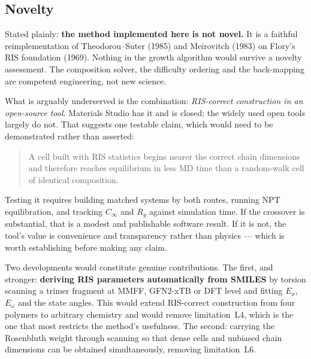\documentclass[11pt,a4paper]{article}
\begin{document}
\subsection{Novelty}

Stated plainly: \textbf{the method implemented here is not novel.} It is a
faithful reimplementation of Theodorou--Suter (1985) and Meirovitch (1983) on
Flory's RIS foundation (1969). Nothing in the growth algorithm would survive a
novelty assessment. The composition solver, the difficulty ordering and the
back-mapping are competent engineering, not new science.

What is arguably underserved is the combination: \emph{RIS-correct
construction in an open-source tool}. Materials Studio has it and is closed;
the widely used open tools largely do not. That suggests one testable claim,
which would need to be demonstrated rather than asserted:

\begin{quote}
A cell built with RIS statistics begins nearer the correct chain dimensions
and therefore reaches equilibrium in less MD time than a random-walk cell of
identical composition.
\end{quote}

Testing it requires building matched systems by both routes, running NPT
equilibration, and tracking $C_\infty$ and $R_g$ against simulation time. If
the crossover is substantial, that is a modest and publishable software
result. If it is not, the tool's value is convenience and transparency rather
than physics --- which is worth establishing before making any claim.

Two developments would constitute genuine contributions. The first, and
stronger: \textbf{deriving RIS parameters automatically from SMILES} by
torsion scanning a trimer fragment at MMFF, GFN2-xTB or DFT level and fitting
$E_\sigma$, $E_\omega$ and the state angles. This would extend RIS-correct
construction from four polymers to arbitrary chemistry and would remove
limitation~L4, which is the one that most restricts the method's usefulness.
The second: carrying the Rosenbluth weight through scanning so that dense
cells and unbiased chain dimensions can be obtained simultaneously, removing
limitation~L6.
\end{document}
